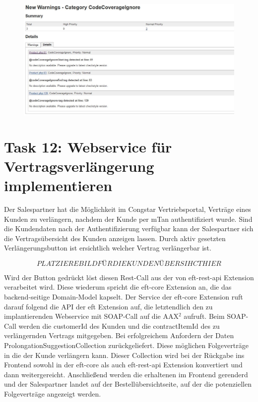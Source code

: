\documentclass[11pt,a4paper]{article} %
\begin{document}
\begin{figure}[h]
\includegraphics[width=\textwidth]{images/resultSniffer.JPG}
\centering
\end{figure}




\section{Task 12: Webservice für Vertragsverlängerung implementieren}

Der Salespartner hat die Möglichkeit im Congstar Vertriebsportal, Verträge eines
Kunden zu verlängern, nachdem der Kunde per mTan authentifiziert wurde. 
Sind die Kundendaten nach der Authentifizierung verfügbar kann der Salespartner 
sich die Vertragsübersicht des Kunden anzeigen lassen. Durch aktiv gesetzten 
Verlängerungsbutton ist ersichtlich welcher Vertrag verlängerbar ist.

$$ PLATZIERE BILD FÜR DIE KUNDENÜBERSIHCT HIER $$

Wird der Button gedrückt löst diesen Rest-Call aus der von eft-rest-api Extension
verarbeitet wird. Diese wiederum spricht die eft-core Extension an, die das backend-seitige Domain-Model kapselt. Der Service der eft-core Extension ruft darauf folgend 
die API der eft Extension auf, die letztendlich den zu implantierenden Webservice mit SOAP-Call
auf die AAX$^2$ aufruft. Beim SOAP-Call werden die customerId des Kunden und die contractItemId des zu verlängernden Vertrags mitgegeben. Bei erfolgreichem Anfordern der 
Daten ProlongationSuggestionCollection zurückgeliefert. Diese möglichen Folgeverträge in 
die der Kunde verlängern kann. Dieser Collection wird bei der Rückgabe ins Frontend sowohl in der eft-core als auch eft-rest-api Extension konvertiert und dann weitergereicht. Anschließend werden die erhaltenen im Frontend gerenderd und der Salespartner landet auf der Bestellübersichtseite, auf der die potenziellen Folgeverträge angezeigt werden. 
\end{document}
